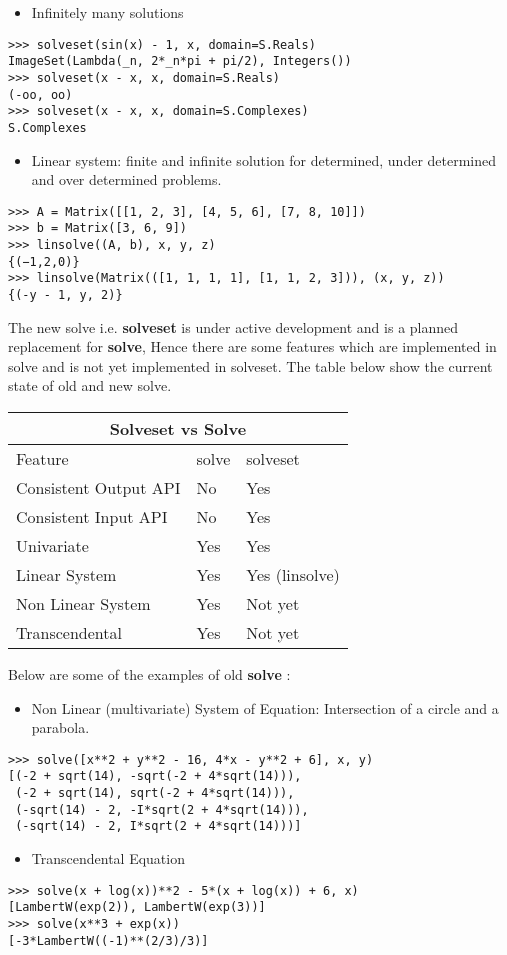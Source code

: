 \begin{itemize}
\item Infinitely many solutions
\end{itemize}
\begin{verbatim}
>>> solveset(sin(x) - 1, x, domain=S.Reals)
ImageSet(Lambda(_n, 2*_n*pi + pi/2), Integers())
>>> solveset(x - x, x, domain=S.Reals)
(-oo, oo)
>>> solveset(x - x, x, domain=S.Complexes)
S.Complexes
\end{verbatim}

\begin{itemize}
\item Linear system: finite and infinite solution for determined, under
determined and over determined problems.
\end{itemize}
\begin{verbatim}
>>> A = Matrix([[1, 2, 3], [4, 5, 6], [7, 8, 10]])
>>> b = Matrix([3, 6, 9])
>>> linsolve((A, b), x, y, z)
{(−1,2,0)}
>>> linsolve(Matrix(([1, 1, 1, 1], [1, 1, 2, 3])), (x, y, z))
{(-y - 1, y, 2)}
\end{verbatim}

The new solve i.e. \textbf{solveset} is under active development and is a
planned replacement for \textbf{solve}, Hence there are some features which are
implemented in solve and is not yet implemented in solveset. The table below
show the current state of old and new solve.

\hfill

\begin{tabular}{ |p{4cm}|p{3cm}|p{3cm}|  }
\hline
\multicolumn{3}{|c|}{Solveset vs Solve} \\
\hline
Feature& solve &solveset \\
\hline
Consistent Output API & No & Yes \\
Consistent Input API & No & Yes \\
Univariate & Yes & Yes\\
Linear System& Yes & Yes (linsolve) \\
Non Linear System& Yes & Not yet \\
Transcendental& Yes & Not yet \\
\hline
\end{tabular}

\hfill \break

Below are some of the examples of old \textbf{solve} :

\begin{itemize}
\item Non Linear (multivariate) System of Equation: Intersection of a circle
and a parabola.
\end{itemize}
\begin{verbatim}
>>> solve([x**2 + y**2 - 16, 4*x - y**2 + 6], x, y)
[(-2 + sqrt(14), -sqrt(-2 + 4*sqrt(14))),
 (-2 + sqrt(14), sqrt(-2 + 4*sqrt(14))),
 (-sqrt(14) - 2, -I*sqrt(2 + 4*sqrt(14))),
 (-sqrt(14) - 2, I*sqrt(2 + 4*sqrt(14)))]
\end{verbatim}

\begin{itemize}
\item Transcendental Equation
\end{itemize}
\begin{verbatim}
>>> solve(x + log(x))**2 - 5*(x + log(x)) + 6, x)
[LambertW(exp(2)), LambertW(exp(3))]
>>> solve(x**3 + exp(x))
[-3*LambertW((-1)**(2/3)/3)]
\end{verbatim}
